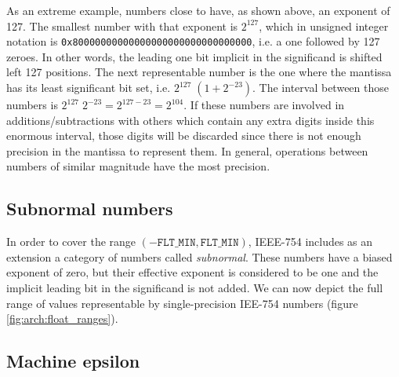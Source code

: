 
As an extreme example, numbers close to  have, as shown above, an
exponent of 127.  The smallest number with that exponent is $2^{127}$, which in
unsigned integer notation is \texttt{0x80000000000000000000000000000000}, i.e.
a one followed by 127 zeroes.  In other words, the leading one bit implicit in
the significand is shifted left 127 positions.  The next representable number is
the one where the mantissa has its least significant bit set, i.e. $2^{127} \;
(1 + 2^{-23})$.  The interval between those numbers is $2^{127} \; 2^{-23} =
2^{127-23} = 2^{104}$.  If these numbers are involved in additions/subtractions
with others which contain any extra digits inside this enormous interval, those
digits will be discarded since there is not enough precision in the mantissa to
represent them.  In general, operations between numbers of similar magnitude
have the most precision.

\subsection{Subnormal numbers}

\label{subsec:arch:subnormal}

In order to cover the range $(-\texttt{FLT\_MIN},\texttt{FLT\_MIN})$, IEEE-754
includes as an extension a category of numbers called \textit{subnormal}.  These
numbers have a biased exponent of zero, but their effective exponent is
considered to be one and the implicit leading bit in the significand is not
added.  We can now depict the full range of values representable by
single-precision IEE-754 numbers (figure \ref{fig:arch:float_ranges}).

\subsection{Machine epsilon}

